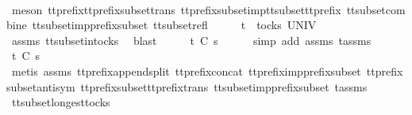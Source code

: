 \begin{isabellebody}
\ \ \ \ \isamarkupfalse%
\ {\isacharparenleft}meson\ tt{\isacharunderscore}prefix{\isacharunderscore}tt{\isacharunderscore}prefix{\isacharunderscore}subset{\isacharunderscore}trans\ tt{\isacharunderscore}prefix{\isacharunderscore}subset{\isacharunderscore}imp{\isacharunderscore}tt{\isacharunderscore}subset{\isacharunderscore}tt{\isacharunderscore}prefix\ tt{\isacharunderscore}subset{\isacharunderscore}combine\ tt{\isacharunderscore}subset{\isacharunderscore}imp{\isacharunderscore}prefix{\isacharunderscore}subset\ tt{\isacharunderscore}subset{\isacharunderscore}refl{\isacharparenright}\isanewline
\ \ \isamarkupfalse%
\ \isamarkupfalse%
\ {\isachardoublequoteopen}t{\isacharprime}\ {\isasymin}\ tocks\ UNIV{\isachardoublequoteclose}\isanewline
\ \ \ \ \isamarkupfalse%
\ assms{\isacharparenleft}{}{\isacharparenright}\ tt{\isacharunderscore}subset{\isacharunderscore}in{\isacharunderscore}tocks{}\ \isamarkupfalse%
\ blast\isanewline
\ \ \isamarkupfalse%
\ \isamarkupfalse%
\ {\isachardoublequoteopen}t{\isacharprime}\ {\isasymle}\isactrlsub C\ s{}{\isachardoublequoteclose}\isanewline
\ \ \ \ \isamarkupfalse%
\ {\isacharparenleft}simp\ add{\isacharcolon}\ assms{\isacharparenleft}{}{\isacharparenright}\ t{\isacharprime}{\isacharunderscore}assms{\isacharparenright}\isanewline
\ \ \isamarkupfalse%
\ \isamarkupfalse%
\ {\isachardoublequoteopen}t\ {\isasymle}\isactrlsub C\ s{}{\isachardoublequoteclose}\isanewline
\ \ \ \ \isamarkupfalse%
\ {\isacharparenleft}metis\ assms{\isacharparenleft}{}{\isacharparenright}\ tt{\isacharunderscore}prefix{\isacharunderscore}append{\isacharunderscore}split\ tt{\isacharunderscore}prefix{\isacharunderscore}concat\ tt{\isacharunderscore}prefix{\isacharunderscore}imp{\isacharunderscore}prefix{\isacharunderscore}subset\ tt{\isacharunderscore}prefix{\isacharunderscore}subset{\isacharunderscore}antisym\ tt{\isacharunderscore}prefix{\isacharunderscore}subset{\isacharunderscore}tt{\isacharunderscore}prefix{\isacharunderscore}trans\ tt{\isacharunderscore}subset{\isacharunderscore}imp{\isacharunderscore}prefix{\isacharunderscore}subset\ t{\isacharprime}{\isacharunderscore}assms{\isacharparenright}\isanewline
{}\isamarkupfalse%
%
\endisatagproof
{\isafoldproof}%
%
\isadelimproof
\isanewline
%
\endisadelimproof
\isanewline
{}\isamarkupfalse%
\ tt{\isacharunderscore}subset{\isacharunderscore}longest{\isacharunderscore}tocks{}{\isacharcolon}\isanewline

\end{isabellebody}

